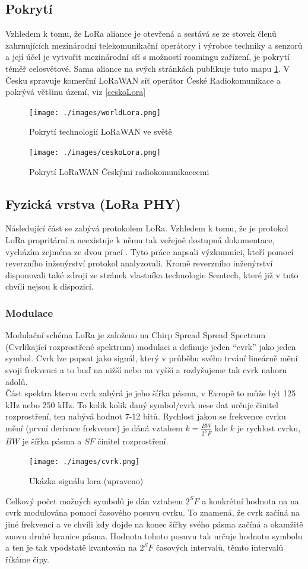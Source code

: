 \documentclass{ctuthesis}
\begin{document}
\subsection{Pokrytí}
Vzhledem k tomu, že LoRa aliance je otevřená a sestává se ze stovek členů zahrnujících mezinárodní telekomunikační operátory i výrobce techniky a senzorů a její účel je vytvořit mezinárodní síť s možností roamingu zařízení, je pokrytí téměř celosvětové. Sama aliance na svých stránkách publikuje tuto mapu \ref{worldLora}. V Česku spravuje komerční LoRaWAN síť operátor České Radiokomunikace a pokrývá většinu území, viz \ref{ceskoLora}
\begin{figure}
\caption{Pokrytí technologií LoRaWAN ve světě \cite{loraalliance}}
\texttt{[image: ./images/worldLora.png]}
\label{worldLora}
\end{figure}
\begin{figure}
\caption{Pokrytí LoRaWAN Českými radiokomunikacecmi \cite{cralora}}
\texttt{[image: ./images/ceskoLora.png]}
\label{fig:loraSpec}
\end{figure}
\subsection{Fyzická vrstva (LoRa PHY)}
Následující část se zabývá protokolem LoRa. Vzhledem k tomu, že je protokol LoRa propritární a neexistuje k němu tak veřejně dostupná dokumentace, vycházím zejména ze dvou prací \cite{gr-lora2016} \cite{gr-lora2018}. Tyto práce napsali výzkumníci, kteří pomocí reverzního inženýrství protokol analyzovali. Kromě reverzního inženýrství disponovali také zdroji ze stránek vlastníka technologie Semtech, které již v tuto chvíli nejsou k dispozici.
\subsubsection{Modulace}
Modulační schéma LoRa je založeno na Chirp Spread Spread Spectrum (Cvrlikající rozprostřené spektrum) modulaci  \cite{iotnetwroks2015} a definuje jeden “cvrk” jako jeden symbol. Cvrk lze popsat jako signál, který v průběhu svého trvání lineárně mění svoji frekvenci a to buď na nižší nebo na vyšší a rozlyšujeme tak cvrk nahoru adolů.\\ 
Část spektra kterou cvrk zabýrá je jeho šířka pásma, v Evropě to může být 125 kHz nebo 250 kHz. To kolik kolik daný symbol/cvrk nese dat určuje činitel rozprostření, ten nabývá hodnot 7-12 bitů. Rychlost jakou se frekvence cvrku mění (první derivace frekvence) je dáná vztahem $k = \frac{BW}{2^SF}$ kde $k$ je rychlost cvrku, $BW$ je šířka pásma a $SF$ činitel rozprostření.\\
\begin{figure}
\caption{Ukázka signálu lora  \cite{gr-lora2016} (upraveno)}
\texttt{[image: ./images/cvrk.png]}
\label{fig:lora1}
\end{figure}
Celkový počet možných symbolů je dán vztahem $2^SF$ a konkrétní hodnota na na cvrk modulována pomocí časového posuvu cvrku. To znamená, že cvrk začíná na jiné frekvenci a ve chvíli kdy dojde na konec šířky svého pásma začíná a okamžitě znovu druhé hranice pásma. Hodnota tohoto posuvu tak určuje hodnotu symbolu a ten je tak vpodstatě kvantován na $2^SF$ časových intervalů, těmto intervalů říkáme čipy.
\end{document}
